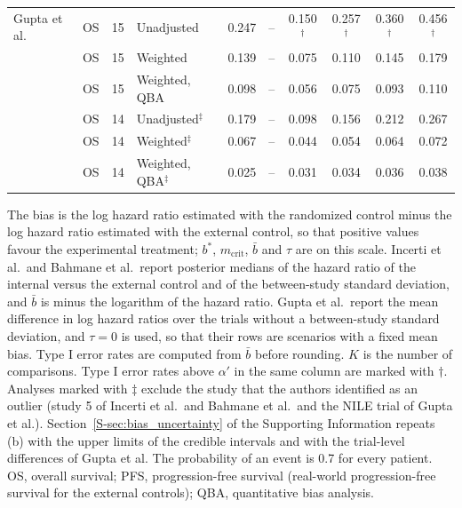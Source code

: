 \begin{table}[!htb]
\begin{tabular}{llclcccccc}
Gupta et al.~\cite{Gupta2025} & OS & 15 & Unadjusted & 0.247 & -- & 0.150$^{\dagger}$ & 0.257$^{\dagger}$ & 0.360$^{\dagger}$ & 0.456$^{\dagger}$ \\
 & OS & 15 & Weighted & 0.139 & -- & 0.075 & 0.110 & 0.145 & 0.179 \\
 & OS & 15 & Weighted, QBA & 0.098 & -- & 0.056 & 0.075 & 0.093 & 0.110 \\
 & OS & 14 & Unadjusted$^{\ddagger}$ & 0.179 & -- & 0.098 & 0.156 & 0.212 & 0.267 \\
 & OS & 14 & Weighted$^{\ddagger}$ & 0.067 & -- & 0.044 & 0.054 & 0.064 & 0.072 \\
 & OS & 14 & Weighted, QBA$^{\ddagger}$ & 0.025 & -- & 0.031 & 0.034 & 0.036 & 0.038 \\
\bottomrule
\end{tabular}
\par\smallskip
\begin{minipage}{0.95\linewidth}
\footnotesize
The bias is the log hazard ratio estimated with the randomized control minus the log hazard ratio estimated with the external control, so that positive values favour the experimental treatment; $b^{*}$, $m_{\mathrm{crit}}$, $\bar{b}$ and $\tau$ are on this scale. Incerti et al.\ and Bahmane et al.\ report posterior medians of the hazard ratio of the internal versus the external control and of the between-study standard deviation, and $\bar{b}$ is minus the logarithm of the hazard ratio. Gupta et al.\ report the mean difference in log hazard ratios over the trials without a between-study standard deviation, and $\tau = 0$ is used, so that their rows are scenarios with a fixed mean bias. Type I error rates are computed from $\bar{b}$ before rounding. $K$ is the number of comparisons. Type I error rates above $\alpha'$ in the same column are marked with $\dagger$. Analyses marked with $\ddagger$ exclude the study that the authors identified as an outlier (study 5 of Incerti et al.\ and Bahmane et al.\ and the NILE trial of Gupta et al.). Section~\ref{S-sec:bias_uncertainty} of the Supporting Information repeats (b) with the upper limits of the credible intervals and with the trial-level differences of Gupta et al. The probability of an event is 0.7 for every patient. OS, overall survival; PFS, progression-free survival (real-world progression-free survival for the external controls); QBA, quantitative bias analysis.
\end{minipage}
\end{table}
